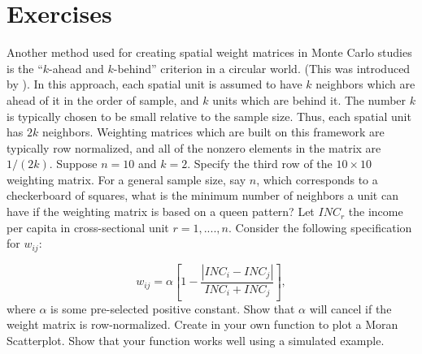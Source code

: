 \section{Exercises}

\begin{exercises}
 \exercise Another method used for creating spatial weight matrices in Monte Carlo studies is the ``$k$-ahead and $k$-behind'' criterion in a circular world. (This was introduced by \cite{kelejian1999generalized}). In this approach, each spatial unit is assumed to have $k$ neighbors which are ahead of it in the order of sample, and $k$ units which are behind it. The number $k$ is typically chosen to be small relative to the sample size. Thus, each spatial unit has $2k$ neighbors. Weighting matrices which are built on this framework are typically row normalized, and all of the nonzero elements in the matrix are $1/(2k)$. Suppose $n =10$ and $k =2$. Specify the third row of the $10\times 10$ weighting matrix.
 \exercise For a general sample size, say $n$, which corresponds to a checkerboard of squares, what is the minimum number of neighbors a unit can have if the weighting matrix is based on a queen pattern?
 \exercise  Let $INC_r$ the income per capita in cross-sectional unit $r = 1, ...., n$. Consider the following specification for $w_{ij}$:
	
	\begin{equation*}
	w_{ij}= \alpha\left[1 - \frac{\left|INC_i - INC_j\right|}{INC_i+ INC_j}\right], 
	\end{equation*}
	where $\alpha$ is some pre-selected positive constant. Show that $\alpha$ will cancel if the weight matrix is row-normalized.
	\exercise  Create in  your own function to plot a Moran Scatterplot. Show that your function works well using a simulated example. 
\end{exercises}
